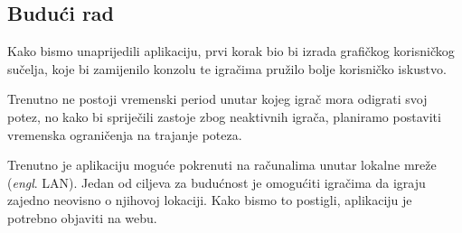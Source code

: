 \documentclass[conference]{IEEEtran}
\begin{document}
\subsection{Budući rad}

Kako bismo unaprijedili aplikaciju, prvi korak bio bi izrada grafičkog korisničkog sučelja, koje bi zamijenilo konzolu te igračima pružilo bolje korisničko iskustvo.

Trenutno ne postoji vremenski period unutar kojeg igrač mora odigrati svoj potez, no kako bi spriječili zastoje zbog neaktivnih igrača, planiramo postaviti vremenska ograničenja na trajanje poteza.

Trenutno je aplikaciju moguće pokrenuti na računalima unutar lokalne mreže (\textit{engl}. LAN). Jedan od ciljeva za budućnost je omogućiti igračima da igraju zajedno neovisno o njihovoj lokaciji. Kako bismo to postigli, aplikaciju je potrebno objaviti na webu.




\end{document}
